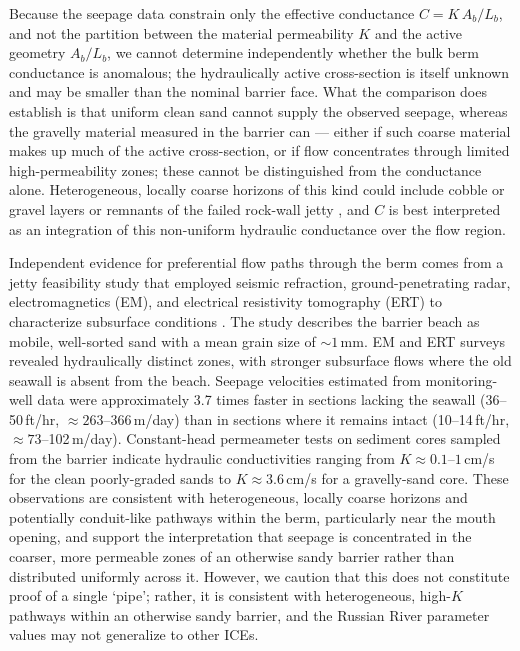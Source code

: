 \documentclass[preprint,12pt,authoryear]{elsarticle}
\begin{document}
Because the seepage data constrain only the effective conductance $C = K\,A_b/L_b$, and not the partition between the material permeability $K$ and the active geometry $A_b/L_b$, we cannot determine independently whether the bulk berm conductance is anomalous; the hydraulically active cross-section is itself unknown and may be smaller than the nominal barrier face. What the comparison does establish is that uniform clean sand cannot supply the observed seepage, whereas the gravelly material measured in the barrier can --- either if such coarse material makes up much of the active cross-section, or if flow concentrates through limited high-permeability zones; these cannot be distinguished from the conductance alone. Heterogeneous, locally coarse horizons of this kind could include cobble or gravel layers or remnants of the failed rock-wall jetty \citep{behrens2009characterization}, and $C$ is best interpreted as an integration of this non-uniform hydraulic conductance over the flow region.

Independent evidence for preferential flow paths through the berm comes from a jetty feasibility study that employed seismic refraction, ground-penetrating radar, electromagnetics (EM), and electrical resistivity tomography (ERT) to characterize subsurface conditions \citep{BehrensEtAl_2017_GoatRock}.
The study describes the barrier beach as mobile, well-sorted sand with a mean grain size of ${\sim}1$\,mm.
EM and ERT surveys revealed hydraulically distinct zones, with stronger subsurface flows where the old seawall is absent from the beach.
Seepage velocities estimated from monitoring-well data were approximately 3.7 times faster in sections lacking the seawall (36--50\,ft/hr, ${\approx}263$--366\,m/day) than in sections where it remains intact (10--14\,ft/hr, ${\approx}73$--102\,m/day).
Constant-head permeameter tests on sediment cores sampled from the barrier indicate hydraulic conductivities ranging from $K \approx 0.1$--$1$\,cm/s for the clean poorly-graded sands to $K \approx 3.6$\,cm/s for a gravelly-sand core.
These observations are consistent with heterogeneous, locally coarse horizons and potentially conduit-like pathways within the berm, particularly near the mouth opening, and support the interpretation that seepage is concentrated in the coarser, more permeable zones of an otherwise sandy barrier rather than distributed uniformly across it.
However, we caution that this does not constitute proof of a single `pipe'; rather, it is consistent with heterogeneous, high-$K$ pathways within an otherwise sandy barrier, and the Russian River parameter values may not generalize to other ICEs.
\end{document}
